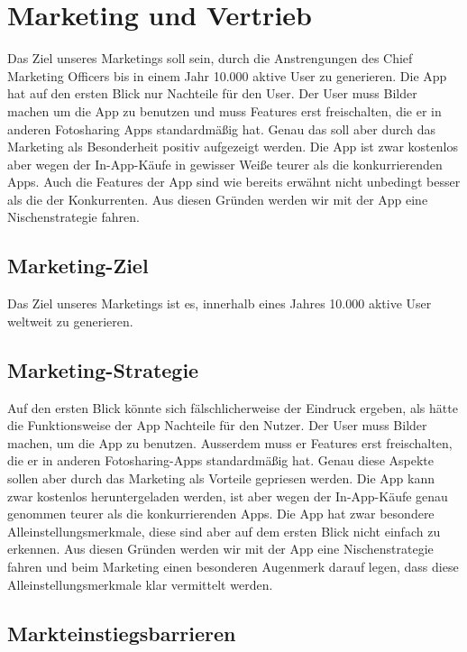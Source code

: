 \chapter{Marketing und Vertrieb}

Das Ziel unseres Marketings soll sein, durch die Anstrengungen des Chief Marketing Officers bis in einem Jahr 10.000 aktive User zu generieren.
Die App hat auf den ersten Blick nur Nachteile für den User. Der User muss Bilder machen um die App zu benutzen und muss Features erst freischalten, die er in anderen Fotosharing Apps standardmäßig hat. Genau das soll aber durch das Marketing als Besonderheit positiv aufgezeigt werden.
Die App ist zwar kostenlos aber wegen der In-App-Käufe in gewisser Weiße teurer als die konkurrierenden Apps. Auch die Features der App sind wie bereits erwähnt nicht unbedingt besser als die der Konkurrenten. Aus diesen Gründen werden wir mit der App eine Nischenstrategie fahren.


\section{Marketing-Ziel}

Das Ziel unseres Marketings ist es, innerhalb eines Jahres 10.000 aktive User weltweit zu generieren.

\section{Marketing-Strategie}

Auf den ersten Blick könnte sich fälschlicherweise der Eindruck ergeben, als hätte die Funktionsweise der App Nachteile für den Nutzer. Der User muss Bilder machen, um die App zu benutzen. Ausserdem muss er Features erst freischalten, die er in anderen Fotosharing-Apps standardmäßig hat. Genau diese Aspekte sollen aber durch das Marketing als Vorteile gepriesen werden.
Die App kann zwar kostenlos heruntergeladen werden, ist aber wegen der In-App-Käufe genau genommen teurer als die konkurrierenden Apps. Die App hat zwar besondere Alleinstellungsmerkmale, diese sind aber auf dem ersten Blick nicht einfach zu erkennen. Aus diesen Gründen werden wir mit der App eine Nischenstrategie fahren und beim Marketing einen besonderen Augenmerk darauf legen, dass diese Alleinstellungsmerkmale klar vermittelt werden.

\section{Markteinstiegsbarrieren}

